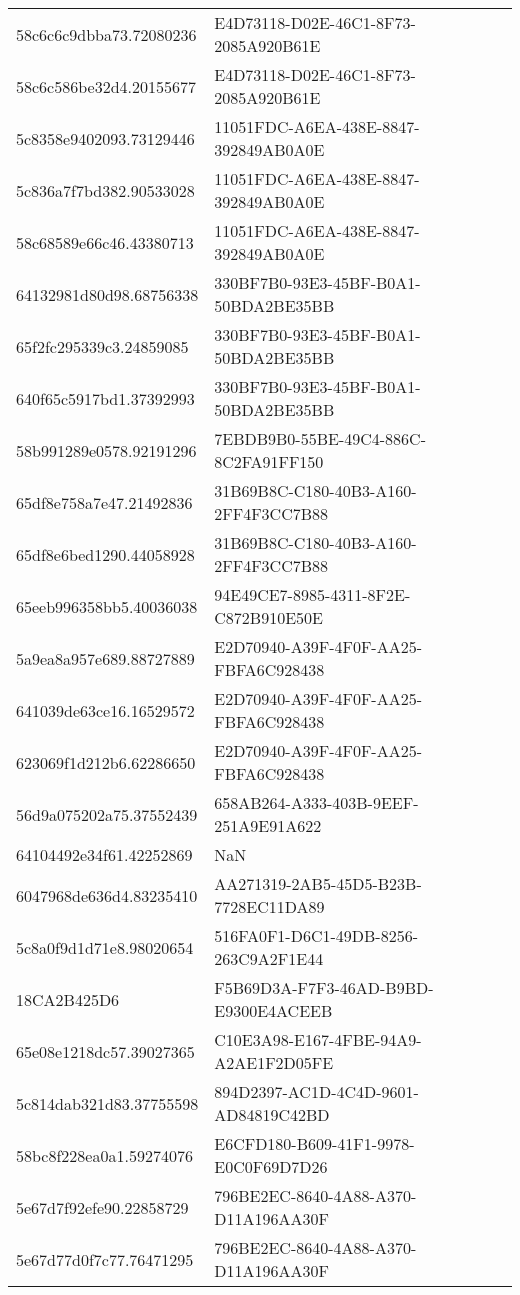 \begin{tabular}{ll}
58c6c6c9dbba73.72080236 & E4D73118-D02E-46C1-8F73-2085A920B61E \\
58c6c586be32d4.20155677 & E4D73118-D02E-46C1-8F73-2085A920B61E \\
5c8358e9402093.73129446 & 11051FDC-A6EA-438E-8847-392849AB0A0E \\
5c836a7f7bd382.90533028 & 11051FDC-A6EA-438E-8847-392849AB0A0E \\
58c68589e66c46.43380713 & 11051FDC-A6EA-438E-8847-392849AB0A0E \\
64132981d80d98.68756338 & 330BF7B0-93E3-45BF-B0A1-50BDA2BE35BB \\
65f2fc295339c3.24859085 & 330BF7B0-93E3-45BF-B0A1-50BDA2BE35BB \\
640f65c5917bd1.37392993 & 330BF7B0-93E3-45BF-B0A1-50BDA2BE35BB \\
58b991289e0578.92191296 & 7EBDB9B0-55BE-49C4-886C-8C2FA91FF150 \\
65df8e758a7e47.21492836 & 31B69B8C-C180-40B3-A160-2FF4F3CC7B88 \\
65df8e6bed1290.44058928 & 31B69B8C-C180-40B3-A160-2FF4F3CC7B88 \\
65eeb996358bb5.40036038 & 94E49CE7-8985-4311-8F2E-C872B910E50E \\
5a9ea8a957e689.88727889 & E2D70940-A39F-4F0F-AA25-FBFA6C928438 \\
641039de63ce16.16529572 & E2D70940-A39F-4F0F-AA25-FBFA6C928438 \\
623069f1d212b6.62286650 & E2D70940-A39F-4F0F-AA25-FBFA6C928438 \\
56d9a075202a75.37552439 & 658AB264-A333-403B-9EEF-251A9E91A622 \\
64104492e34f61.42252869 & NaN \\
6047968de636d4.83235410 & AA271319-2AB5-45D5-B23B-7728EC11DA89 \\
5c8a0f9d1d71e8.98020654 & 516FA0F1-D6C1-49DB-8256-263C9A2F1E44 \\
18CA2B425D6 & F5B69D3A-F7F3-46AD-B9BD-E9300E4ACEEB \\
65e08e1218dc57.39027365 & C10E3A98-E167-4FBE-94A9-A2AE1F2D05FE \\
5c814dab321d83.37755598 & 894D2397-AC1D-4C4D-9601-AD84819C42BD \\
58bc8f228ea0a1.59274076 & E6CFD180-B609-41F1-9978-E0C0F69D7D26 \\
5e67d7f92efe90.22858729 & 796BE2EC-8640-4A88-A370-D11A196AA30F \\
5e67d77d0f7c77.76471295 & 796BE2EC-8640-4A88-A370-D11A196AA30F \\

\end{tabular}
